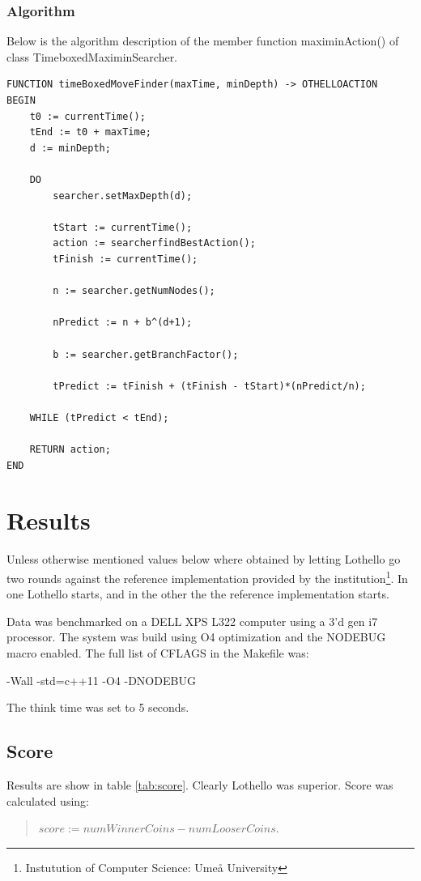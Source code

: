 \documentclass[a4paper,11pt]{article}
\begin{document}
\subsubsection{Algorithm}
Below is the algorithm description of the member function maximinAction() of class TimeboxedMaximinSearcher.

\begin{lstlisting}
FUNCTION timeBoxedMoveFinder(maxTime, minDepth) -> OTHELLOACTION
BEGIN
	t0 := currentTime();
	tEnd := t0 + maxTime;
	d := minDepth;
	
	DO
		searcher.setMaxDepth(d);
		
		tStart := currentTime();
		action := searcherfindBestAction();
		tFinish := currentTime();
		
		n := searcher.getNumNodes();
		
		nPredict := n + b^(d+1);
		
		b := searcher.getBranchFactor();
		
		tPredict := tFinish + (tFinish - tStart)*(nPredict/n);
		
	WHILE (tPredict < tEnd);
	
	RETURN action;
END
\end{lstlisting}

\section{Results}
Unless otherwise mentioned values below where obtained by letting Lothello go two rounds against the reference implementation provided by the institution\footnote{Instutution of Computer Science: Umeå University}. In one Lothello starts, and in the other the the reference implementation starts.

Data was benchmarked on a DELL XPS L322 computer using a 3'd gen i7 processor. The system was build using O4 optimization and the NODEBUG macro enabled. The full list of CFLAGS in the Makefile was:

-Wall -std=c++11 -O4 -DNODEBUG

The think time was set to 5 seconds.

\subsection{Score}
Results are show in table \ref{tab:score}. Clearly Lothello was superior. Score was calculated using:
\begin{quotation}
$score :=  numWinnerCoins - numLooserCoins$.
\end{quotation}
\end{document}
